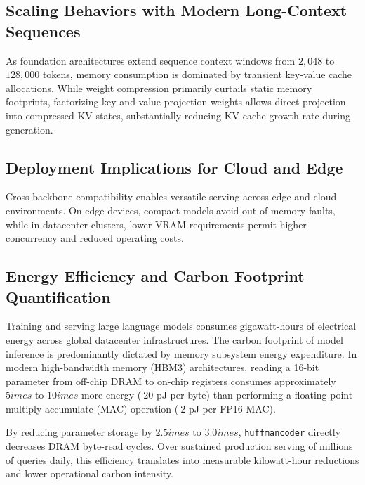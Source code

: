 \subsection{Scaling Behaviors with Modern Long-Context Sequences}
As foundation architectures extend sequence context windows from $2{,}048$ to $128{,}000$ tokens, memory consumption is dominated by transient key-value cache allocations. While weight compression primarily curtails static memory footprints, factorizing key and value projection weights allows direct projection into compressed KV states, substantially reducing KV-cache growth rate during generation.

\subsection{Deployment Implications for Cloud and Edge}
Cross-backbone compatibility enables versatile serving across edge and cloud environments. On edge devices, compact models avoid out-of-memory faults, while in datacenter clusters, lower VRAM requirements permit higher concurrency and reduced operating costs.

\subsection{Energy Efficiency and Carbon Footprint Quantification}
Training and serving large language models consumes gigawatt-hours of electrical energy across global datacenter infrastructures. The carbon footprint of model inference is predominantly dictated by memory subsystem energy expenditure. In modern high-bandwidth memory (HBM3) architectures, reading a 16-bit parameter from off-chip DRAM to on-chip registers consumes approximately $5	imes$ to $10	imes$ more energy ($~20$ pJ per byte) than performing a floating-point multiply-accumulate (MAC) operation ($~2$ pJ per FP16 MAC).

By reducing parameter storage by $2.5	imes$ to $3.0	imes$, \texttt{huffmancoder} directly decreases DRAM byte-read cycles. Over sustained production serving of millions of queries daily, this efficiency translates into measurable kilowatt-hour reductions and lower operational carbon intensity.
